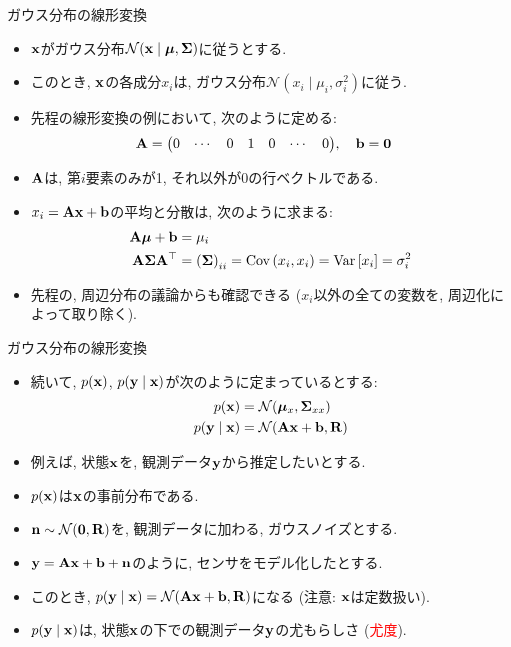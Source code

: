 \documentclass[dvipdfmx,notheorems,t]{beamer}
\begin{document}
\begin{frame}{ガウス分布の線形変換}
\begin{itemize}
  \item $\vb{x}$がガウス分布$\mathcal{N}(\vb{x} \mid \vb*{\mu}, \vb{\Sigma})$に従うとする.
  \item このとき, $\vb{x}$の各成分$x_i$は, ガウス分布$\mathcal{N}(x_i \mid \mu_i, \sigma_i^2)$に従う.
  \item 先程の線形変換の例において, 次のように定める:
  \begin{align*}
    \vb{A} &= \mqty(0 & \cdots & 0 & 1 & 0 & \cdots & 0), \quad \vb{b} = \vb{0}
  \end{align*}
  \item $\vb{A}$は, 第$i$要素のみが1, それ以外が0の行ベクトルである.
  \item $x_i = \vb{A} \vb{x} + \vb{b}$の平均と分散は, 次のように求まる:
  \begin{align*}
    \vb{A} \vb*{\mu} + \vb{b} &= \mu_i \\
    \vb{A} \vb{\Sigma} \vb{A}^\top &= \left( \vb{\Sigma} \right)_{ii}
      = \operatorname{Cov} \left( x_i, x_i \right) = \operatorname{Var} \left[ x_i \right] = \sigma_i^2
  \end{align*}
  \item 先程の, 周辺分布の議論からも確認できる ($x_i$以外の全ての変数を, 周辺化によって取り除く).
\end{itemize}
\end{frame}

\begin{frame}{ガウス分布の線形変換}
\begin{itemize}
  \item 続いて, $p(\vb{x})$, $p(\vb{y} \mid \vb{x})$が次のように定まっているとする:
  \begin{align*}
    p(\vb{x}) &= \mathcal{N}(\vb*{\mu}_x, \vb{\Sigma}_{xx}) \\
    p(\vb{y} \mid \vb{x}) &= \mathcal{N}(\vb{A} \vb{x} + \vb{b}, \vb{R})
  \end{align*}
  \item 例えば, 状態$\vb{x}$を, 観測データ$\vb{y}$から推定したいとする.
  \item $p(\vb{x})$は$\vb{x}$の事前分布である.
  \item $\vb{n} \sim \mathcal{N}(\vb{0}, \vb{R})$を, 観測データに加わる, ガウスノイズとする.
  \item $\vb{y} = \vb{A} \vb{x} + \vb{b} + \vb{n}$のように, センサをモデル化したとする.
  \item このとき, $p(\vb{y} \mid \vb{x}) = \mathcal{N}(\vb{A} \vb{x} + \vb{b}, \vb{R})$になる
  (注意: $\vb{x}$は定数扱い).
  \item $p(\vb{y} \mid \vb{x})$は, 状態$\vb{x}$の下での観測データ$\vb{y}$の尤もらしさ (\textcolor{red}{尤度}).
\end{itemize}
\end{frame}
\end{document}
